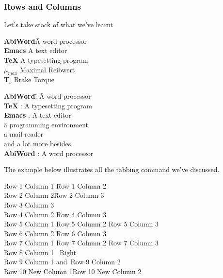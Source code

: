 \documentclass{article}
\theoremstyle{definition}
\theoremstyle{remark}
\theoremstyle{plain}
\numberwithin{equation}{subsection}
\begin{document}
{\subsubsection{Rows and Columns}
Let’s take stock of what we’ve learnt
\begin{tabbing}
	\hspace{1cm}\= \textbf{AbiWord}\quad\= A word processor\\[5pt]
	\> \textbf{Emacs} \> A text editor\\[5pt]
	\> \textbf{\TeX} \> A typesetting program\\[5pt]
	\> $\mu_{max}$\> Maximal Reibwert\\[5pt]
	\> \textbf{T}$_{b}$ \> Brake Torque
\end{tabbing}
\begin{tabbing}
	\textbf{AbiWord}\quad\= : \= A word processor\kill\\
	\textbf{\TeX}\quad \> : \> A typesetting program\\[5pt]
	\textbf{Emacs}\quad \> : \> A text editor\\[5pt]
	\> \> \quad\= a programming environment\\[5pt]
	\> \> \> a mail reader\\[5pt]
	\> \> \> and a lot more besides\\[5pt]
	\textbf{AbiWord}\quad\> : \> A word processor
\end{tabbing}
The example below illustrates all the tabbing command we've discussed.
\begin{tabbing}
	Row 1 Column 1\hspace{2cm}
	\= Row 1 Column 2\\[5pt]
	\> Row 2 Column 2\hspace{1.5cm}\=Row 2 Column 3\+\+\\[5pt]
	Row 3 Column 3\-\\[5pt]
	Row 4 Column 2 \>Row 4 Column 3\\[5pt]
	\< Row 5 Column 1 \> Row 5 Column 2 \>Row 5 Column 3\\[5pt]
	Row 6 Column 2 \>Row 6 Column 3\-\\[5pt]
	Row 7 Column 1 \> Row 7 Column 2 \>Row 7 Column 3\\[5pt]
	Row 8 Column 1 \ Right\\[5pt]
	Row 9 Column 1 \> and\ Row 9 Column 2\\[5pt]
	\pushtabs
	\quad\= Row 10 New Column 1\hspace{2.5cm}\= Row 10 New Column 2\\[5pt]

\end{tabbing}}
\end{document}

